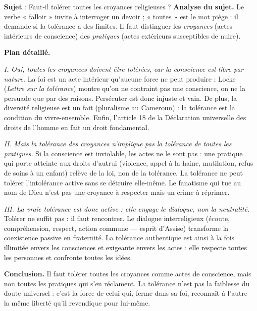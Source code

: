\documentclass[11pt]{article}
\begin{document}
\begin{exoresolu}
\textbf{Sujet} : Faut-il tolérer toutes les croyances religieuses ?
\tcblower
\textbf{Analyse du sujet.} Le verbe « falloir » invite à interroger un devoir ; « toutes » est le mot piège : il demande si la tolérance a des limites. Il faut distinguer les \emph{croyances} (actes intérieurs de conscience) des \emph{pratiques} (actes extérieurs susceptibles de nuire).

\textbf{Plan détaillé.}

\emph{I. Oui, toutes les croyances doivent être tolérées, car la conscience est libre par nature.}
La foi est un acte intérieur qu'aucune force ne peut produire : Locke (\emph{Lettre sur la tolérance}) montre qu'on ne contraint pas une conscience, on ne la persuade que par des raisons. Persécuter est donc injuste et vain. De plus, la diversité religieuse est un fait (pluralisme au Cameroun) : la tolérance est la condition du vivre-ensemble. Enfin, l'article 18 de la Déclaration universelle des droits de l'homme en fait un droit fondamental.

\emph{II. Mais la tolérance des croyances n'implique pas la tolérance de toutes les pratiques.}
Si la conscience est inviolable, les actes ne le sont pas : une pratique qui porte atteinte aux droits d'autrui (violence, appel à la haine, mutilation, refus de soins à un enfant) relève de la loi, non de la tolérance. La tolérance ne peut tolérer l'intolérance active sans se détruire elle-même. Le fanatisme qui tue au nom de Dieu n'est pas une croyance à respecter mais un crime à réprimer.

\emph{III. La vraie tolérance est donc active : elle engage le dialogue, non la neutralité.}
Tolérer ne suffit pas : il faut rencontrer. Le dialogue interreligieux (écoute, compréhension, respect, action commune — esprit d'Assise) transforme la coexistence passive en fraternité. La tolérance authentique est ainsi à la fois illimitée envers les consciences et exigeante envers les actes : elle respecte toutes les personnes et confronte toutes les idées.

\textbf{Conclusion.} Il faut tolérer toutes les croyances comme actes de conscience, mais non toutes les pratiques qui s'en réclament. La tolérance n'est pas la faiblesse du doute universel : c'est la force de celui qui, ferme dans sa foi, reconnaît à l'autre la même liberté qu'il revendique pour lui-même.
\end{exoresolu}
\end{document}
